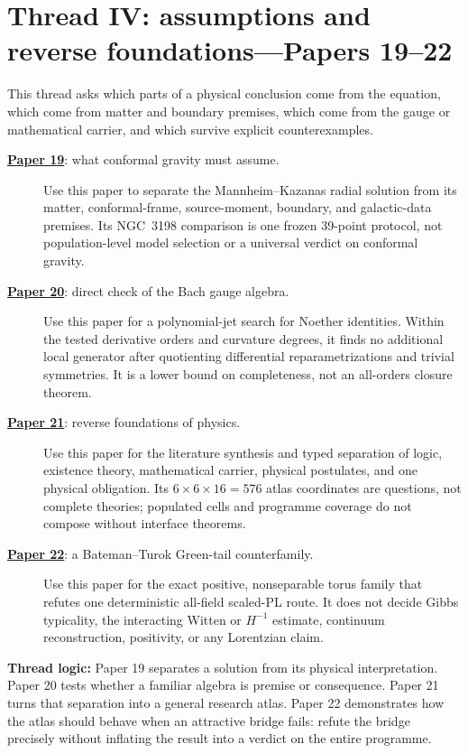 \documentclass[11pt]{article}
\newcommand{\paperlink}[2]{\href{#1}{\textbf{Paper #2}}}
\begin{document}
\section{Thread IV: assumptions and reverse foundations---Papers 19--22}

This thread asks which parts of a physical conclusion come from the equation,
which come from matter and boundary premises, which come from the gauge or
mathematical carrier, and which survive explicit counterexamples.

\begin{description}
\item[\paperlink{19-what-conformal-gravity-must-assume.pdf}{19}: what
conformal gravity must assume.]
Use this paper to separate the Mannheim--Kazanas radial solution from its
matter, conformal-frame, source-moment, boundary, and galactic-data premises.
Its NGC~3198 comparison is one frozen 39-point protocol, not population-level
model selection or a universal verdict on conformal gravity.

\item[\paperlink{20-is-the-gauge-algebra-an-assumption.pdf}{20}: direct check
of the Bach gauge algebra.]
Use this paper for a polynomial-jet search for Noether identities.  Within
the tested derivative orders and curvature degrees, it finds no additional
local generator after quotienting differential reparametrizations and
trivial symmetries.  It is a lower bound on completeness, not an all-orders
closure theorem.

\item[\paperlink{21-reverse-foundations-of-physics.pdf}{21}: reverse
foundations of physics.]
Use this paper for the literature synthesis and typed separation of logic,
existence theory, mathematical carrier, physical postulates, and one physical
obligation.  Its \(6\times6\times16=576\) atlas coordinates are questions,
not complete theories; populated cells and programme coverage do not compose
without interface theorems.

\item[\paperlink{22-bateman-turok-euclidean-torus-collapse.pdf}{22}: a
Bateman--Turok Green-tail counterfamily.]
Use this paper for the exact positive, nonseparable torus family that refutes
one deterministic all-field scaled-PL route.  It does not decide Gibbs
typicality, the interacting Witten or \(H^{-1}\) estimate, continuum
reconstruction, positivity, or any Lorentzian claim.
\end{description}

\textbf{Thread logic:}
Paper 19 separates a solution from its physical interpretation.  Paper 20
tests whether a familiar algebra is premise or consequence.  Paper 21 turns
that separation into a general research atlas.  Paper 22 demonstrates how the
atlas should behave when an attractive bridge fails: refute the bridge
precisely without inflating the result into a verdict on the entire programme.
\end{document}
